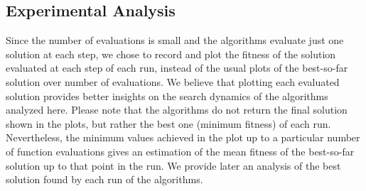 \documentclass[sigconf,dvipsnames]{acmart}
\begin{document}
\subsection{Experimental Analysis} %



Since the number of evaluations is  small and the algorithms evaluate just
one solution at each step, we chose to record and plot the fitness of the
solution evaluated at each step of each run, instead of the usual plots of the
best-so-far solution over number of evaluations. We believe that plotting each
evaluated solution provides better insights on the search dynamics of the
algorithms analyzed here. %
Please note that the algorithms do not return the
final solution shown in the plots, but rather the best one (minimum fitness) of
each run. Nevertheless, the minimum values achieved in the plot up to a
particular number of function evaluations gives an estimation of the mean
fitness of the best-so-far solution up to that point in the run. We provide
later an analysis of the best solution found by each run of the algorithms.
\end{document}

